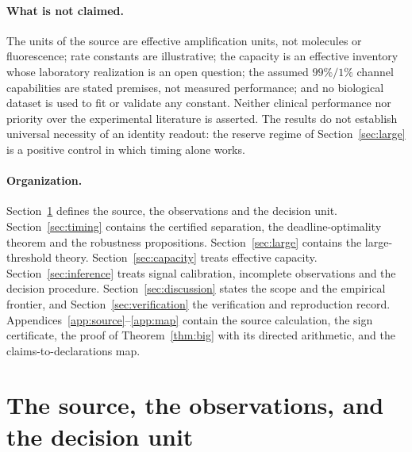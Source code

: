 \documentclass[11pt,a4paper]{article}
\theoremstyle{plain}
\theoremstyle{definition}
\theoremstyle{remark}
\begin{document}
\paragraph{What is not claimed.}
The units of the source are effective amplification units, not molecules or fluorescence; rate constants are illustrative; the capacity is an effective inventory whose laboratory realization is an open question; the assumed $99\%/1\%$ channel capabilities are stated premises, not measured performance; and no biological dataset is used to fit or validate any constant. Neither clinical performance nor priority over the experimental literature is asserted. The results do not establish universal necessity of an identity readout: the reserve regime of Section~\ref{sec:large} is a positive control in which timing alone works.

\paragraph{Organization.}
Section~\ref{sec:source} defines the source, the observations and the decision unit. Section~\ref{sec:timing} contains the certified separation, the deadline-optimality theorem and the robustness propositions. Section~\ref{sec:large} contains the large-threshold theory. Section~\ref{sec:capacity} treats effective capacity. Section~\ref{sec:inference} treats signal calibration, incomplete observations and the decision procedure. Section~\ref{sec:discussion} states the scope and the empirical frontier, and Section~\ref{sec:verification} the verification and reproduction record. Appendices~\ref{app:source}--\ref{app:map} contain the source calculation, the sign certificate, the proof of Theorem~\ref{thm:big} with its directed arithmetic, and the claims-to-declarations map.

\section{The source, the observations, and the decision unit}\label{sec:source}
\end{document}
